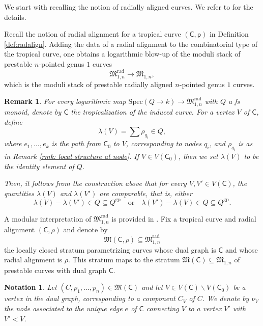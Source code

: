 \documentclass{article}
\def\mC{\mathsf{C}}
\newtheorem{remark}[definition]{Remark}
\newtheorem{notation}[definition]{Notation}
\begin{document}
We start with recalling the notion of radially aligned curves. We refer to \cite{RSWI, BNR21, KS} for the details.



Recall the notion of radial alignment for a tropical curve $(\mathsf{C},\mathsf{p})$ in Definition \ref{def:radalign}. Adding the data of a radial alignment to the combinatorial type of the tropical curve, one obtains a logarithmic blow-up of the moduli stack of prestable $n$-pointed genus $1$ curves
\[
\mathfrak{M}_{1,n}^{\mathrm{rad}} \longrightarrow \mathfrak{M}_{1,n},
\]
which is the moduli stack of prestable radially aligned $n$-pointed genus $1$ curves.

\begin{remark}
    
For every logarithmic map $\mathrm{Spec}(Q \to k) \to \mathfrak{M}_{1,n}^{\mathrm{rad}}$ with $Q$ a fs monoid, denote by $\mathsf{C}$ the tropicalization of the induced curve. For a vertex $V$ of $\mathsf{C}$,  define
\[
\lambda(V) = \sum \rho_{q_i} \in Q,
\]
where $e_1,\ldots,e_k$ is the path from $\mathsf{C}_0$ to $V$, corresponding to nodes $q_i$, and $\rho_{q_i}$ is as in Remark \ref{rmk: local structure at node}. If $V \in V(\mathsf{C}_0)$, then we set $\lambda(V)$ to be the identity element of $Q$.

Then, it follows from the construction above that for every $V,V' \in V(\mathsf{C})$, the quantities $\lambda(V)$ and $\lambda(V')$ are comparable, that is, either
\[
\lambda(V) - \lambda(V') \in Q \subseteq Q^{\mathrm{gp}}
\quad \text{or} \quad
\lambda(V') - \lambda(V) \in Q \subseteq Q^{\mathrm{gp}}.
\]
\end{remark}

A modular interpretation of $\mathfrak{M}_{1,n}^{\mathrm{rad}}$ is provided in \cite[Lemma~3.2]{KS}. Fix a tropical curve and radial alignment $(\mathsf{C},\rho)$ and denote by
\[
\mathfrak{M}(\mathsf{C},\rho) \subseteq \mathfrak{M}_{1,n}^{\mathrm{rad}}
\]
the locally closed stratum parametrizing curves whose dual graph is $\mathsf{C}$ and whose radial alignment is $\rho$. This stratum maps to the stratum
$
\mathfrak{M}(\mathsf{C}) \subseteq \mathfrak{M}_{1,n}
$
of prestable curves with dual graph $\mathsf{C}$.

\begin{notation}
   Let $(C,p_1,\ldots,p_n) \in \mathfrak{M}(\mathsf{C})$ and let $V \in V(\mathsf{C}) \smallsetminus V(\mC_0)$ be a vertex in the dual graph, corresponding to a component $C_V$ of $C$. We denote by $\nu_V$ the node associated to the unique edge $e$ of $\mathsf{C}$ connecting $V$ to a vertex $V'$ with $V' < V$.
\end{notation}
\end{document}
